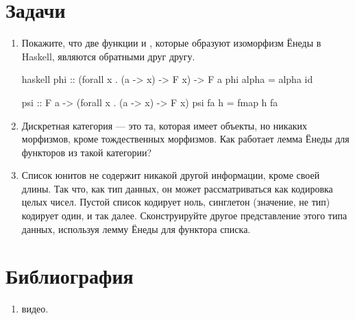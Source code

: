 \section{Задачи}

\begin{enumerate}
  \tightlist
  \item
        Покажите, что две функции  и , которые образуют
        изоморфизм Ёнеды в Haskell, являются обратными друг другу.

        \begin{snip}{haskell}
phi :: (forall x . (a -> x) -> F x) -> F a
phi alpha = alpha id

psi :: F a -> (forall x . (a -> x) -> F x)
psi fa h = fmap h fa
\end{snip}
  \item
        Дискретная категория --- это та, которая имеет объекты, но никаких морфизмов, кроме
        тождественных морфизмов. Как работает лемма Ёнеды для функторов
        из такой категории?
  \item
        Список юнитов \code{{[}(){]}} не содержит никакой другой информации, кроме
        своей длины. Так что, как тип данных, он может рассматриваться как кодировка
        целых чисел. Пустой список кодирует ноль, синглетон \code{{[}(){]}} (значение,
        не тип) кодирует один, и так далее. Сконструируйте другое
        представление этого типа данных, используя лемму Ёнеды для функтора
        списка.
\end{enumerate}

\section{Библиография}

\begin{enumerate}
  \tightlist
  \item
         видео.
\end{enumerate}
